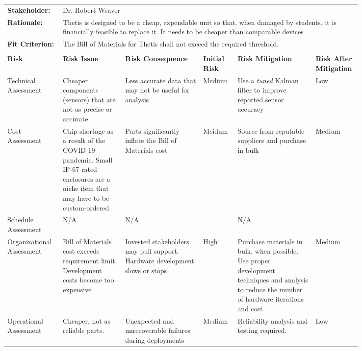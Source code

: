 \begin{landscape}
{\begin{longtable}{| p{0.12\linewidth} | p{0.16\linewidth} |  p{0.20\linewidth} | p{0.08\linewidth} | p{0.20\linewidth} | p{0.08\linewidth} |}
	\hline
	\rowcolor[gray]{0.8}
	\multicolumn{6}{|c|}{ } \\
	\hline
	\textbf{Stakeholder:} & \multicolumn{5}{|l|}{Dr. Robert Weaver} \\
	\hline
	\textbf{Rationale:} & \multicolumn{5}{|p{0.8\linewidth}|}{Thetis is designed to be a cheap, expendable unit so that, when damaged by students, it is financially feasible to replace it. It needs to be cheaper than comparable devices} \\
	\hline
	\textbf{Fit Criterion:} & \multicolumn{5}{|p{0.8\linewidth}|}{The Bill of Materials for Thetis shall not exceed the required threshold.} \\
	\hline
	\rowcolor[gray]{0.8}
	\multicolumn{6}{|c|}{ } \\
	\hline
	\textbf{Risk} & \textbf{Risk Issue} & \textbf{Risk Consequence} & \textbf{Initial Risk} & \textbf{Risk Mitigation} & \textbf{Risk \newline After \newline Mitigation} \\
	\hline
	Technical \newline Assessment & Cheaper components (sensors) that are not as precise or accurate. & Less accurate data that may not be useful for analysis & \cellcolor{yellow} Medium & Use a \emph{tuned} Kalman filter to improve reported sensor accuracy & \cellcolor{green} Low \\
	\hline
	Cost \newline Assessment & Chip shortage as a result of the COVID-19 pandemic. \newline Small IP-67 rated enclosures are a niche item that may have to be custom-ordered & Parts significantly inflate the Bill of Materials cost & \cellcolor{yellow} Meidum & Source from reputable suppliers and purchase in bulk & \cellcolor{yellow} Medium \\
	\hline
	Schedule \newline Assessment & N/A & N/A & \cellcolor[gray]{0.8} & N/A & \cellcolor[gray]{0.8} \\
	\hline
	Organizational \newline Assessment & Bill of Materials cost exceeds requirement limit. \newline Development costs become too expensive & Invested stakeholders may pull support. \newline Hardware development slows or stops & \cellcolor{red} High & Purchase materials in bulk, when possible. \newline Use proper development techniques and analysis to reduce the number of hardware iterations and cost  & \cellcolor{yellow} Medium \\
	\hline
	Operational \newline Assessment & Cheaper, not as reliable parts. & Unexpected and unrecoverable failures during deployments & \cellcolor{yellow} Medium & Reliability analysis and testing required. & \cellcolor{green} Low
	\label{tab:sr04_feasibility}
\end{longtable}
}
\newpage


\end{landscape}
